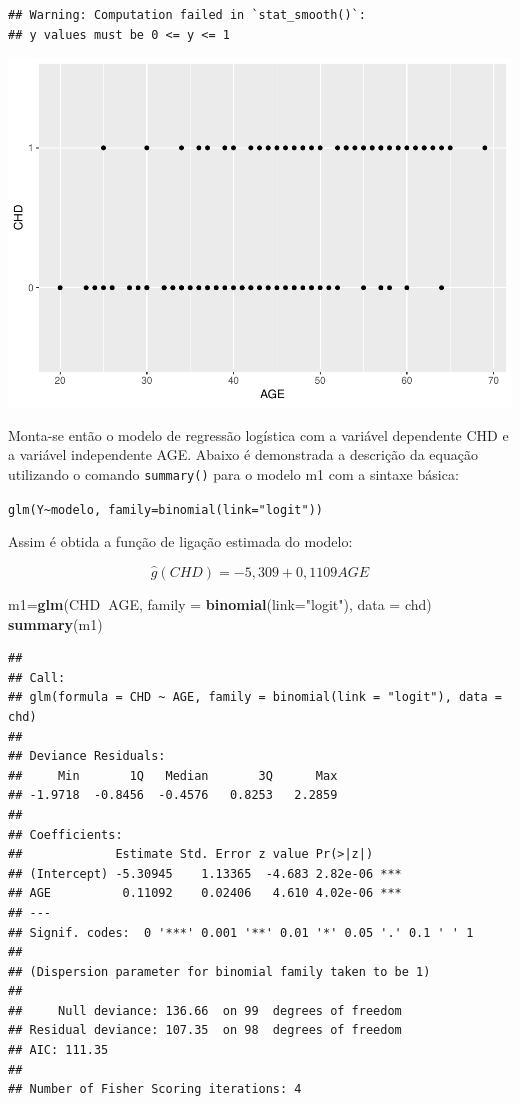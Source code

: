 \documentclass[12pt,brazil,]{book}
\newenvironment{Shaded}{\begin{snugshade}}{\end{snugshade}}
\newcommand{\DataTypeTok}[1]{\textcolor[rgb]{0.13,0.29,0.53}{#1}}
\newcommand{\KeywordTok}[1]{\textcolor[rgb]{0.13,0.29,0.53}{\textbf{#1}}}
\newcommand{\NormalTok}[1]{#1}
\newcommand{\OperatorTok}[1]{\textcolor[rgb]{0.81,0.36,0.00}{\textbf{#1}}}
\newcommand{\StringTok}[1]{\textcolor[rgb]{0.31,0.60,0.02}{#1}}
\begin{document}
\begin{verbatim}
## Warning: Computation failed in `stat_smooth()`:
## y values must be 0 <= y <= 1
\end{verbatim}

\includegraphics{05-RegLogist_files/figure-latex/unnamed-chunk-3-1.pdf}

Monta-se então o modelo de regressão logística com a variável dependente
CHD e a variável independente AGE. Abaixo é demonstrada a descrição da
equação utilizando o comando \texttt{summary()} para o modelo m1 com a
sintaxe básica:

\texttt{glm(Y\textasciitilde{}modelo,\ family=binomial(link="logit"))}

Assim é obtida a função de ligação estimada do modelo:

\[
\hat g(CHD) = -5,309 +0,1109AGE
\]

\begin{Shaded}
\begin{Highlighting}[]
\NormalTok{m1=}\KeywordTok{glm}\NormalTok{(CHD}\OperatorTok{~}\NormalTok{AGE, }\DataTypeTok{family =} \KeywordTok{binomial}\NormalTok{(}\DataTypeTok{link=}\StringTok{"logit"}\NormalTok{), }\DataTypeTok{data =}\NormalTok{ chd)}
\KeywordTok{summary}\NormalTok{(m1)}
\end{Highlighting}
\end{Shaded}

\begin{verbatim}
## 
## Call:
## glm(formula = CHD ~ AGE, family = binomial(link = "logit"), data = chd)
## 
## Deviance Residuals: 
##     Min       1Q   Median       3Q      Max  
## -1.9718  -0.8456  -0.4576   0.8253   2.2859  
## 
## Coefficients:
##             Estimate Std. Error z value Pr(>|z|)    
## (Intercept) -5.30945    1.13365  -4.683 2.82e-06 ***
## AGE          0.11092    0.02406   4.610 4.02e-06 ***
## ---
## Signif. codes:  0 '***' 0.001 '**' 0.01 '*' 0.05 '.' 0.1 ' ' 1
## 
## (Dispersion parameter for binomial family taken to be 1)
## 
##     Null deviance: 136.66  on 99  degrees of freedom
## Residual deviance: 107.35  on 98  degrees of freedom
## AIC: 111.35
## 
## Number of Fisher Scoring iterations: 4
\end{verbatim}
\end{document}
